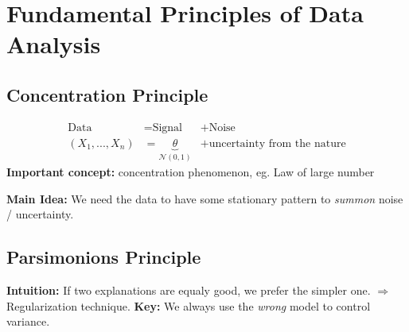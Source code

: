 \documentclass{article}
\begin{document}
\section{Fundamental Principles of Data Analysis}
\subsection{Concentration Principle}
\begin{align*}
\text{Data} &= \text{Signal} &+ \text{Noise} \\
(X_1, ... , X_n) &= \underbrace{\theta}_{\mathcal N(0, 1)} &+ \text{uncertainty from the nature}
\end{align*}
\textbf{Important concept:} concentration phenomenon, eg. Law of large number


\textbf{Main Idea:} We need the data to have some stationary pattern to \textit{summon} noise / uncertainty.
\subsection{Parsimonions Principle}
\textbf{Intuition:}  If two explanations are equaly good, we prefer the simpler one. $\Rightarrow$ Regularization technique.
\textbf{Key:} We always use the \textit{wrong} model to control variance.
\end{document}
